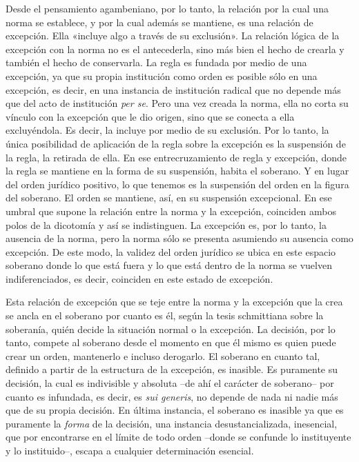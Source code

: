 Desde el pensamiento agambeniano, por lo tanto, la relación por la cual una norma se establece, y por la cual además se mantiene, es una relación de excepción. Ella «incluye algo a través de su exclusión». La relación lógica de la excepción con la norma no es el antecederla, sino más bien el hecho de crearla y también el hecho de conservarla. La regla es fundada por medio de una excepción, ya que su propia institución como orden es posible sólo en una excepción, es decir, en una instancia de institución radical que no depende más que del acto de institución \emph{per se}. Pero una vez creada la norma, ella no corta su vínculo con la excepción que le dio origen, sino que se conecta a ella excluyéndola. Es decir, la incluye por medio de su exclusión. Por lo tanto, la única posibilidad de aplicación de la regla sobre la excepción es la suspensión de la regla, la retirada de ella. En ese entrecruzamiento de regla y excepción, donde la regla se mantiene en la forma de su suspensión, habita el soberano. Y en lugar del orden jurídico positivo, lo que tenemos es la suspensión del orden en la figura del soberano. El orden se mantiene, así, en su suspensión excepcional. En ese umbral que supone la relación entre la norma y la excepción, coinciden ambos polos de la dicotomía y así se indistinguen. La excepción es, por lo tanto, la ausencia de la norma, pero la norma sólo se presenta asumiendo su ausencia como excepción. De este modo, la validez del orden jurídico se ubica en este espacio soberano donde lo que está fuera y lo que está dentro de la norma se vuelven indiferenciados, es decir, coinciden en este estado de excepción.

Esta relación de excepción que se teje entre la norma y la excepción que la crea se ancla en el soberano por cuanto es él, según la tesis schmittiana sobre la soberanía, quién decide la situación normal o la excepción. La decisión, por lo tanto, compete al soberano desde el momento en que él mismo es quien puede crear un orden, mantenerlo e incluso derogarlo. El soberano en cuanto tal, definido a partir de la estructura de la excepción, es inasible. Es puramente su decisión, la cual es indivisible y absoluta --de ahí el carácter de soberano-- por cuanto es infundada, es decir, es \emph{sui generis}, no depende de nada ni nadie más que de su propia decisión. En última instancia, el soberano es inasible ya que es puramente la \emph{forma} de la decisión, una instancia desustancializada, inesencial, que por encontrarse en el límite de todo orden --donde se confunde lo instituyente y lo instituido--, escapa a cualquier determinación esencial.


